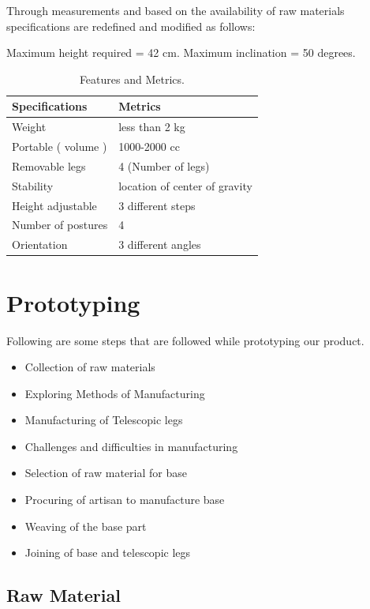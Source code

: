 Through measurements and based on the availability of raw materials specifications are redefined and modified as follows:

Maximum height required = 42 cm.
\newline
Maximum inclination = 50 degrees.

\begin{table}[h!]
  \centering
  \caption{Features and Metrics.}
  \label{tab:table2}
  \begin{tabular}{l||l}
  	\hline
  	Specifications & Metrics\\
    \hline
	Weight & less than 2 kg\\
	Portable ( volume ) &1000-2000 cc\\
	Removable legs & 4 (Number of legs)\\
	Stability & location of center of gravity\\
	Height adjustable & 3 different steps\\
	Number of postures & 4\\
	Orientation & 3 different angles\\

  \end{tabular}
\end{table}


\chapter{Prototyping}
Following are some steps that are followed while prototyping our product.
\begin{itemize}
	\item Collection of raw materials
	\item Exploring Methods of Manufacturing
	\item Manufacturing of Telescopic legs
	\item Challenges and difficulties in manufacturing
	\item Selection of raw material for base
	\item Procuring of artisan to manufacture base
	\item Weaving of the base part
    \item Joining of base and telescopic legs

\end{itemize}

\section{Raw Material}

